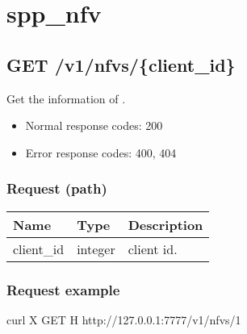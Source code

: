 \documentclass[a4paper,11pt,openany,oneside,english]{sphinxmanual}
\begin{document}
\section{spp\_nfv}
\label{\detokenize{api_ref/spp_nfv:spp-nfv}}\label{\detokenize{api_ref/spp_nfv:spp-ctl-rest-api-spp-nfv}}\label{\detokenize{api_ref/spp_nfv::doc}}

\subsection{GET /v1/nfvs/\{client\_id\}}
\label{\detokenize{api_ref/spp_nfv:get-v1-nfvs-client-id}}
Get the information of .
\begin{itemize}
\item {} 
Normal response codes: 200

\item {} 
Error response codes: 400, 404

\end{itemize}


\subsubsection{Request (path)}
\label{\detokenize{api_ref/spp_nfv:request-path}}

\begin{savenotes}\sphinxattablestart
\centering
{}
\sphinxthecaptionisattop
{}\label{\detokenize{api_ref/spp_nfv:id23}}\label{\detokenize{api_ref/spp_nfv:table-spp-ctl-nfvs-get}}
\sphinxaftertopcaption
\begin{tabulary}{\linewidth}[t]{|T|T|T|}
\hline
\sphinxstyletheadfamily 
Name
&\sphinxstyletheadfamily 
Type
&\sphinxstyletheadfamily 
Description
\\
\hline
client\_id
&
integer
&
client id.
\\
\hline
\end{tabulary}
\par
\sphinxattableend\end{savenotes}


\subsubsection{Request example}
\label{\detokenize{api_ref/spp_nfv:request-example}}
\begin{sphinxVerbatim}[commandchars=\\\{\},formatcom=\footnotesize]
 curl \PYGZhy{}X GET \PYGZhy{}H  
  http://127.0.0.1:7777/v1/nfvs/1
\end{sphinxVerbatim}
\end{document}
